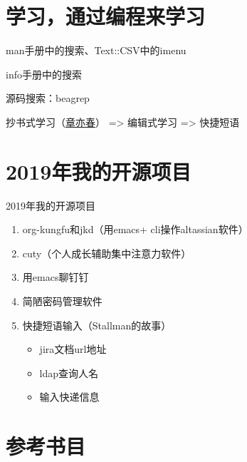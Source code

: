 \documentclass[presentation,dvipdfmx,CJKbookmarks]{beamer}
\begin{document}
\begin{CJK*}{UTF8}{simsun}
\section{学习，通过编程来学习}
\label{sec:orga8186c8}

\begin{frame}[label={sec:org649b9b6}]{}
\begin{block}{man\thinspace 手册中的搜索、Text::CSV\thinspace 中的\thinspace imenu}
\end{block}
\begin{block}{info\thinspace 手册中的搜索}
\end{block}
\begin{block}{源码搜索：beagrep}
\end{block}
\begin{block}{抄书式学习（\href{https://www.zhihu.com/question/28951394}{章亦春}） => 编辑式学习 => 快捷短语}
\end{block}
\end{frame}

\section{2019\thinspace 年我的开源项目}
\label{sec:org7ee26d3}
\begin{frame}[label={sec:org9c25325}]{2019\thinspace 年我的开源项目}
\begin{enumerate}
\item org-kungfu\thinspace 和\thinspace jkd（用\thinspace emacs\thinspace + cli\thinspace 操作\thinspace altassian\thinspace 软件）
\item cuty（个人成长辅助集中注意力软件）
\item 用\thinspace emacs\thinspace 聊钉钉
\item 简陋密码管理软件
\item 快捷短语输入（Stallman\thinspace 的故事）
\begin{itemize}
\item jira\thinspace 文档\thinspace url\thinspace 地址
\item ldap\thinspace 查询人名
\item 输入快递信息
\end{itemize}
\end{enumerate}
\end{frame}

\section{参考书目}
\label{sec:org7949b56}


\end{CJK*}
\end{document}
